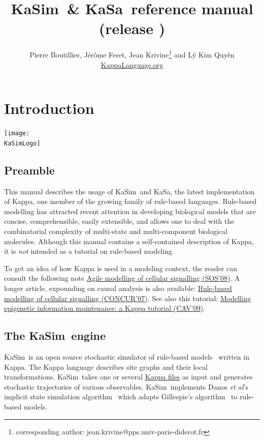 \documentclass[11pt]{book}
\title{KaSim~\& KaSa~reference manual\\ \small (release \version)}
\author{Pierre Boutillier, J\'er\^ome Feret, Jean Krivine\thanks{corresponding author: jean.krivine@pps.univ-paris-diderot.fr} and L\'y Kim Quy\^en \\\href{http://www.kappalanguage.org}{KappaLanguage.org}}
\date{}
\def\KaSimLogo{img/KaSim-Logo.pdf}
\def\KaSim{\textsf{KaSim}}
\def\KaSa{\textsf{KaSa}}
\begin{document}
\maketitle


\tableofcontents
\listoftables

\chapter{Introduction}
\begin{center}\texttt{[image: \\KaSimLogo]}\end{center}

\section{Preamble}
This manual describes the usage of \KaSim~and \KaSa, the latest implementation of Kappa, one member of the growing family of rule-based languages. Rule-based modelling has attracted recent attention in developing biological models that are concise, comprehensible, easily extensible, and allows one to deal with the combinatorial complexity of multi-state and multi-component biological molecules. 
Although this manual contains a self-contained description of Kappa, it is \emph{not} intended as a tutorial on rule-based modeling.%
%

To get an idea of how Kappa is used in a modeling context, the reader can consult the following note \href{http://www.pps.univ-paris-diderot.fr/~danos/pdf/eov.pdf}{Agile modelling of cellular signalling (SOS'08)}. A longer article, expounding on causal analysis is also available: \href{http://www.pps.univ-paris-diderot.fr/~danos/pdf/ka-fix.pdf}{Rule-based modelling of cellular signalling (CONCUR'07)}. See also this tutorial: \href{http://www.pps.univ-paris-diderot.fr/~danos/pdf/mytdg.pdf}{Modelling epigenetic information maintenance: a Kappa tutorial (CAV'09)}.




\section{The \KaSim~engine}
\KaSim~is an open source stochastic simulator of rule-based models~\cite{DanLan04,Dan_etal07a,Fae_etal05} written in Kappa. The Kappa language describes site graphs and their local transformations. \KaSim~takes one or several \hyperref[chap:kappa]{Kappa files} as input and generates stochastic trajectories of various observables. \KaSim~implements Danos \textit{et al}'s implicit state simulation algorithm~\cite{Dan_etal07b} which adapts Gillespie's algorithm~\cite{Gil76,Gil77} to rule-based models. 
\end{document}
